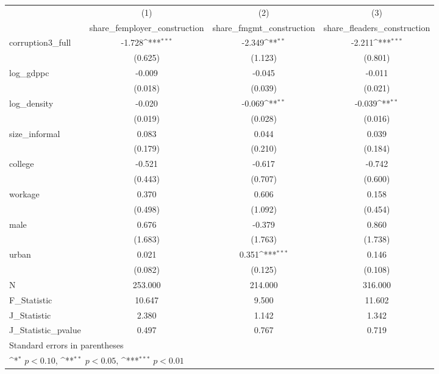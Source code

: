 {
\def\sym#1{\ifmmode^{#1}\else\(^{#1}\)\fi}
\begin{tabular}{l*{3}{c}}
\hline\hline
            &\multicolumn{1}{c}{(1)}&\multicolumn{1}{c}{(2)}&\multicolumn{1}{c}{(3)}\\
            &\multicolumn{1}{c}{share\_femployer\_construction}&\multicolumn{1}{c}{share\_fmgmt\_construction}&\multicolumn{1}{c}{share\_fleaders\_construction}\\
\hline
corruption3\_full&      -1.728\sym{***}&      -2.349\sym{**} &      -2.211\sym{***}\\
            &     (0.625)         &     (1.123)         &     (0.801)         \\
[1em]
log\_gdppc   &      -0.009         &      -0.045         &      -0.011         \\
            &     (0.018)         &     (0.039)         &     (0.021)         \\
[1em]
log\_density &      -0.020         &      -0.069\sym{**} &      -0.039\sym{**} \\
            &     (0.019)         &     (0.028)         &     (0.016)         \\
[1em]
size\_informal&       0.083         &       0.044         &       0.039         \\
            &     (0.179)         &     (0.210)         &     (0.184)         \\
[1em]
college     &      -0.521         &      -0.617         &      -0.742         \\
            &     (0.443)         &     (0.707)         &     (0.600)         \\
[1em]
workage     &       0.370         &       0.606         &       0.158         \\
            &     (0.498)         &     (1.092)         &     (0.454)         \\
[1em]
male        &       0.676         &      -0.379         &       0.860         \\
            &     (1.683)         &     (1.763)         &     (1.738)         \\
[1em]
urban       &       0.021         &       0.351\sym{***}&       0.146         \\
            &     (0.082)         &     (0.125)         &     (0.108)         \\
\hline
N           &     253.000         &     214.000         &     316.000         \\
F\_Statistic &      10.647         &       9.500         &      11.602         \\
J\_Statistic &       2.380         &       1.142         &       1.342         \\
J\_Statistic\_pvalue&       0.497         &       0.767         &       0.719         \\
\hline\hline
\multicolumn{4}{l}{\footnotesize Standard errors in parentheses}\\
\multicolumn{4}{l}{\footnotesize \sym{*} \(p<0.10\), \sym{**} \(p<0.05\), \sym{***} \(p<0.01\)}\\
\end{tabular}
}
